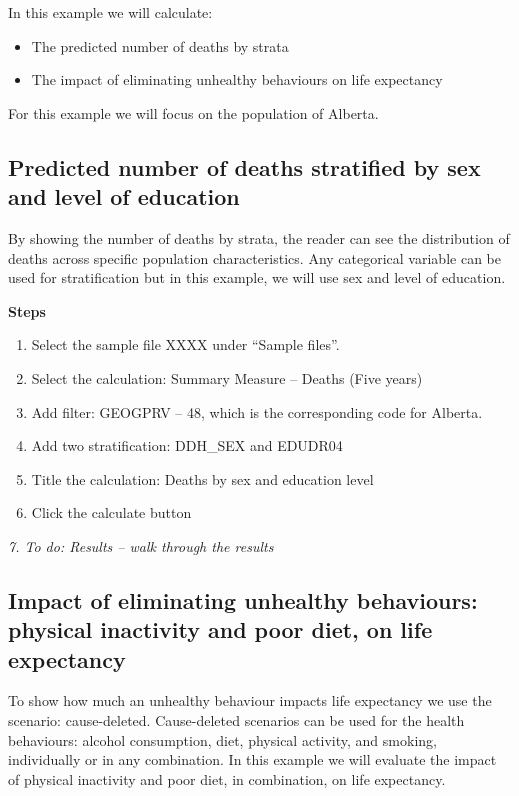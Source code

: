 \documentclass[]{book}
\providecommand{\tightlist}{%
  \setlength{\itemsep}{0pt}\setlength{\parskip}{0pt}}
\begin{document}
In this example we will calculate:

\begin{itemize}
\tightlist
\item
  The predicted number of deaths by strata
\item
  The impact of eliminating unhealthy behaviours on life expectancy
\end{itemize}

For this example we will focus on the population of Alberta.

\subsection{Predicted number of deaths stratified by sex and level of
education}\label{predicted-number-of-deaths-stratified-by-sex-and-level-of-education}

By showing the number of deaths by strata, the reader can see the
distribution of deaths across specific population characteristics. Any
categorical variable can be used for stratification but in this example,
we will use sex and level of education.

\textbf{Steps}

\begin{enumerate}
\def\labelenumi{\arabic{enumi}.}
\item
  Select the sample file XXXX under ``Sample files''.
\item
  Select the calculation: Summary Measure -- Deaths (Five years)
\item
  Add filter: GEOGPRV -- 48, which is the corresponding code for
  Alberta.
\item
  Add two stratification: DDH\_SEX and EDUDR04
\item
  Title the calculation: Deaths by sex and education level
\item
  Click the calculate button
\end{enumerate}

\emph{7. To do: Results -- walk through the results}

\subsection{Impact of eliminating unhealthy behaviours: physical
inactivity and poor diet, on life
expectancy}\label{impact-of-eliminating-unhealthy-behaviours-physical-inactivity-and-poor-diet-on-life-expectancy}

To show how much an unhealthy behaviour impacts life expectancy we use
the scenario: cause-deleted. Cause-deleted scenarios can be used for the
health behaviours: alcohol consumption, diet, physical activity, and
smoking, individually or in any combination. In this example we will
evaluate the impact of physical inactivity and poor diet, in
combination, on life expectancy.
\end{document}
